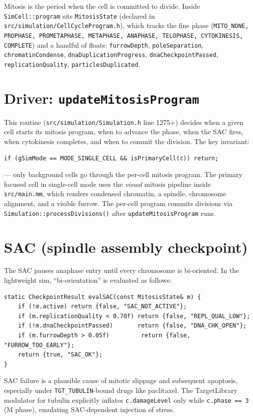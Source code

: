 \documentclass[11pt,letterpaper,twoside,openany]{book}
\newcommand{\code}[1]{\texttt{#1}}
\newcommand{\file}[1]{\texttt{\small#1}}
\begin{document}
Mitosis is the period when the cell is committed to divide. Inside
\code{SimCell::program} sits \code{MitosisState} (declared in
\file{src/simulation/CellCycleProgram.h}), which tracks the fine
phase (\code{MITO\_NONE, PROPHASE, PROMETAPHASE, METAPHASE, ANAPHASE,
TELOPHASE, CYTOKINESIS, COMPLETE}) and a handful of floats:
\code{furrowDepth}, \code{poleSeparation}, \code{chromatinCondense},
\code{dnaDuplicationProgress}, \code{dnaCheckpointPassed},
\code{replicationQuality}, \code{particlesDuplicated}.

\section{Driver: \code{updateMitosisProgram}}

This routine (\file{src/simulation/Simulation.h} line 1275+) decides
when a given cell starts its mitosis program, when to advance the
phase, when the SAC fires, when cytokinesis completes, and when to
commit the division. The key invariant:
\begin{lstlisting}
if (gSimMode == MODE_SINGLE_CELL && isPrimaryCell(c)) return;
\end{lstlisting}
--- only background cells go through the per-cell mitosis program.
The primary focused cell in single-cell mode uses the \emph{visual}
mitosis pipeline inside \file{src/main.mm}, which renders condensed
chromatin, a spindle, chromosome alignment, and a visible furrow.
The per-cell program commits divisions via
\code{Simulation::processDivisions()} after
\code{updateMitosisProgram} runs.

\section{SAC (spindle assembly checkpoint)}

The SAC pauses anaphase entry until every chromosome is bi-oriented.
In the lightweight sim, ``bi-orientation'' is evaluated as follows:
\begin{lstlisting}
static CheckpointResult evalSAC(const MitosisState& m) {
    if (!m.active) return {false, "SAC_NOT_ACTIVE"};
    if (m.replicationQuality < 0.70f) return {false, "REPL_QUAL_LOW"};
    if (!m.dnaCheckpointPassed)       return {false, "DNA_CHK_OPEN"};
    if (m.furrowDepth > 0.05f)         return {false, "FURROW_TOO_EARLY"};
    return {true, "SAC_OK"};
}
\end{lstlisting}
SAC failure is a plausible cause of mitotic slippage and subsequent
apoptosis, especially under \code{TGT\_TUBULIN}-bound drugs like
paclitaxel. The TargetLibrary modulator for tubulin explicitly
inflates \code{c.damageLevel} only while \code{c.phase == 3} (M
phase), emulating SAC-dependent injection of stress.
\end{document}
